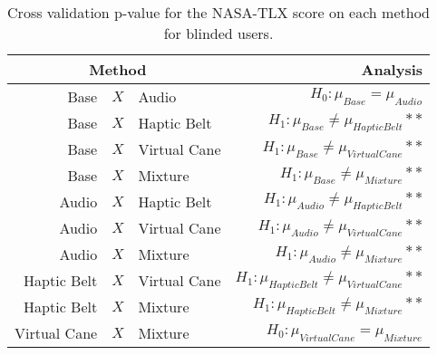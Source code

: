 
\begin{table}[!htb]
\centering
\caption{Cross validation p-value for the NASA-TLX score on each method for blinded users.}
\label{tab:lsd_nasa_avg_two_way_blind}
\begin{tabular}{rclr}
\toprule
      \multicolumn{3}{c}{Method} &                                           Analysis \\
\midrule
              Base & $X$ & Audio &                   $H_0 : \mu_{Base} = \mu_{Audio}$ \\
        Base & $X$ & Haptic Belt &         $H_1 : \mu_{Base} \ne \mu_{Haptic Belt}**$ \\
       Base & $X$ & Virtual Cane &        $H_1 : \mu_{Base} \ne \mu_{Virtual Cane}**$ \\
            Base & $X$ & Mixture &             $H_1 : \mu_{Base} \ne \mu_{Mixture}**$ \\
       Audio & $X$ & Haptic Belt &        $H_1 : \mu_{Audio} \ne \mu_{Haptic Belt}**$ \\
      Audio & $X$ & Virtual Cane &       $H_1 : \mu_{Audio} \ne \mu_{Virtual Cane}**$ \\
           Audio & $X$ & Mixture &            $H_1 : \mu_{Audio} \ne \mu_{Mixture}**$ \\
Haptic Belt & $X$ & Virtual Cane & $H_1 : \mu_{Haptic Belt} \ne \mu_{Virtual Cane}**$ \\
     Haptic Belt & $X$ & Mixture &      $H_1 : \mu_{Haptic Belt} \ne \mu_{Mixture}**$ \\
    Virtual Cane & $X$ & Mixture &         $H_0 : \mu_{Virtual Cane} = \mu_{Mixture}$ \\
\bottomrule
\end{tabular}
\end{table}

